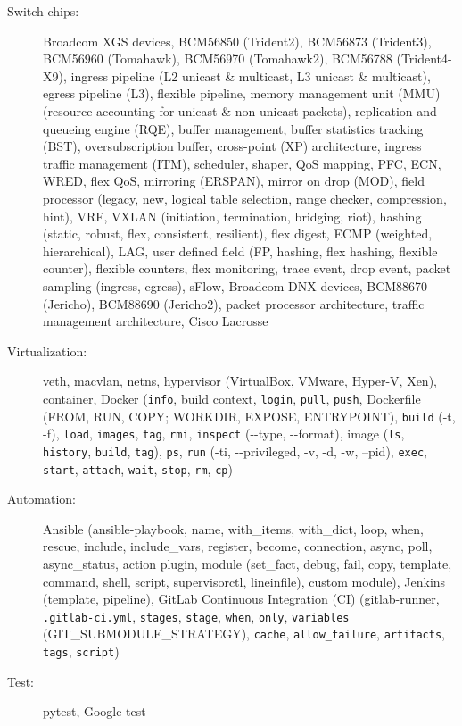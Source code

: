 \documentclass[letterpaper,11pt]{article}
\begin{document}
\begin{description}
\item[Switch chips:] Broadcom XGS devices, BCM56850 (Trident2), BCM56873 (Trident3), BCM56960 (Tomahawk), BCM56970 (Tomahawk2),
BCM56788 (Trident4-X9), ingress pipeline (L2 unicast \& multicast, L3 unicast \& multicast), egress pipeline (L3),
flexible pipeline, memory management unit (MMU) (resource accounting for unicast \& non-unicast packets), replication and queueing engine (RQE),
buffer management, buffer statistics tracking (BST), oversubscription buffer,
cross-point (XP) architecture, ingress traffic management (ITM), scheduler, shaper, QoS mapping, PFC, ECN, WRED, flex QoS,
mirroring (ERSPAN), mirror on drop (MOD),
field processor (legacy, new, logical table selection, range checker, compression, hint),
VRF, VXLAN (initiation, termination, bridging, riot),
hashing (static, robust, flex, consistent, resilient), flex digest, ECMP (weighted, hierarchical), LAG,
user defined field (FP, hashing, flex hashing, flexible counter), flexible counters, flex monitoring,
trace event, drop event,
packet sampling (ingress, egress), sFlow,
Broadcom DNX devices, BCM88670 (Jericho), BCM88690 (Jericho2), packet processor architecture, traffic management architecture,
Cisco Lacrosse

\item[Virtualization:] veth, macvlan, netns, hypervisor (VirtualBox, VMware, Hyper-V, Xen), container, Docker ({\tt info},
build context, {\tt login}, {\tt pull}, {\tt push},
Dockerfile (FROM, RUN, COPY; WORKDIR, EXPOSE, ENTRYPOINT), {\tt build} (-t, -f),
{\tt load}, {\tt images}, {\tt tag}, {\tt rmi}, {\tt inspect} (-{}-type, -{}-format),
image ({\tt ls}, {\tt history}, {\tt build}, {\tt tag}),
{\tt ps}, {\tt run} (-ti, -{}-privileged, -v, -d, -w, --pid), {\tt exec}, {\tt start}, {\tt attach}, {\tt wait}, {\tt stop}, {\tt rm},
{\tt cp})

\item[Automation:] Ansible (ansible-playbook, name, with\_items, with\_dict, loop, when, rescue, include, include\_vars, register, become, connection,
async, poll, async\_status, action plugin,
module (set\_fact, debug, fail, copy, template, command, shell, script, supervisorctl, lineinfile), custom module),
Jenkins (template, pipeline), GitLab Continuous Integration (CI) (gitlab-runner, {\tt .gitlab-ci.yml}, {\tt stages}, {\tt stage},
{\tt when}, {\tt only}, {\tt variables} (GIT\_SUBMODULE\_STRATEGY), {\tt cache}, {\tt allow\_failure}, {\tt artifacts}, {\tt tags}, {\tt script})

\item[Test:] pytest, Google test


\end{description}
\end{document}
